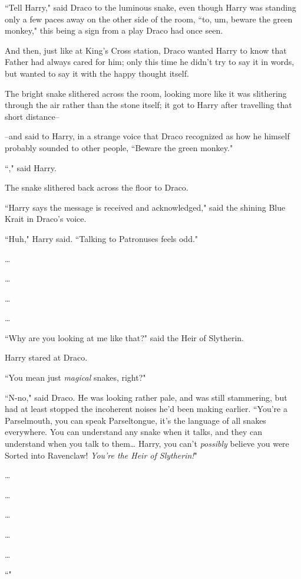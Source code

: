 ``Tell Harry," said Draco to the luminous snake, even though Harry was standing only a few paces away on the other side of the room, ``to, um, beware the green monkey," this being a sign from a play Draco had once seen.

And then, just like at King's Cross station, Draco wanted Harry to know that Father had always cared for him; only this time he didn't try to say it in words, but wanted to say it with the happy thought itself.

The bright snake slithered across the room, looking more like it was slithering through the air rather than the stone itself; it got to Harry after travelling that short distance\---

\---and said to Harry, in a strange voice that Draco recognized as how he himself probably sounded to other people, ``Beware the green monkey."

``," said Harry.

The snake slithered back across the floor to Draco.

``Harry says the message is received and acknowledged," said the shining Blue Krait in Draco's voice.

``Huh," Harry said. ``Talking to Patronuses feels odd."

{\ldots}

{\ldots}

{\ldots}

{\ldots}

``Why are you looking at me like that?" said the Heir of Slytherin.


Harry stared at Draco.

``You mean just \emph{magical} snakes, right?"

``N-no," said Draco. He was looking rather pale, and was still stammering, but had at least stopped the incoherent noises he'd been making earlier. ``You're a Parselmouth, you can speak Parseltongue, it's the language of all snakes everywhere. You can understand any snake when it talks, and they can understand when you talk to them{\ldots} Harry, you can't \emph{possibly} believe you were Sorted into Ravenclaw! \emph{You're the Heir of Slytherin!}"

{\ldots}

{\ldots}

{\ldots}

{\ldots}

{\ldots}

``"

